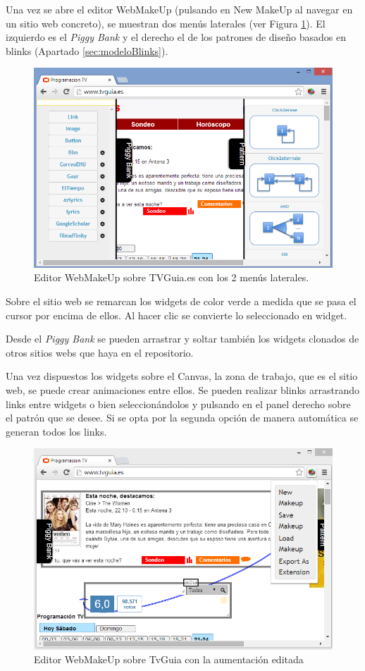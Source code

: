 Una vez se abre el editor WebMakeUp (pulsando en New MakeUp al navegar en un sitio web concreto), se muestran dos menús laterales (ver Figura \ref{fig:EditorWebMakeUpOpened}). El izquierdo es el \emph{Piggy Bank} y el derecho el de los patrones de diseño basados en blinks (Apartado \ref{sec:modeloBlinks}).

\begin{figure}
\centering
\includegraphics[width=0.55\linewidth]{./figs/A-EditorWebMakeUpOpened}
\caption{Editor WebMakeUp sobre TVGuia.es con los 2 menús laterales.}
\label{fig:EditorWebMakeUpOpened}
\end{figure}

Sobre el sitio web se remarcan los widgets de color verde a medida que se pasa el cursor por encima de ellos. Al hacer clic se convierte lo seleccionado en widget.

Desde el \emph{Piggy Bank} se pueden arrastrar y soltar también los widgets clonados de otros sitios webs que haya en el repositorio.

Una vez dispuestos los widgets sobre el Canvas, la zona de trabajo, que es el sitio web, se puede crear animaciones entre ellos. Se pueden realizar blinks arrastrando links entre widgets o bien seleccionándolos y pulsando en el panel derecho sobre el patrón que se desee. Si se opta por la segunda opción de manera automática se generan todos los links.

\begin{figure}
\centering
\includegraphics[width=0.55\linewidth]{./figs/A-EditorWebMakeUpAugmented}
\caption{Editor WebMakeUp sobre TvGuia con la aumentación editada}
\label{fig:EditorWebMakeUpAugmented}
\end{figure}


